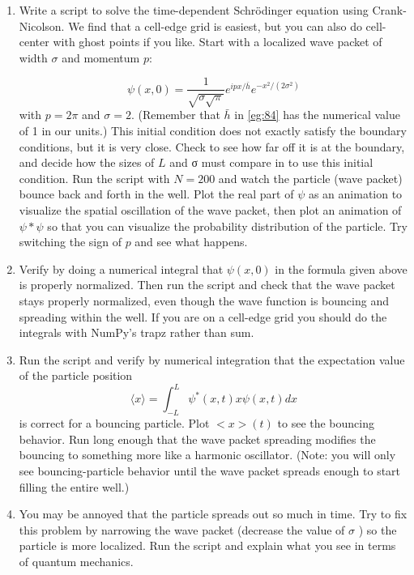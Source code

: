 \documentclass{book}
\theoremstyle{plain}
\theoremstyle{definition}
\numberwithin{exm}{chapter}
\theoremstyle{remark}
\theoremstyle{summary}
\theoremstyle{overview}
\begin{document}
\begin{enumerate}[label=(\alph*)]
	\item  Write a script to solve the time-dependent Schr{\"o}dinger equation using
Crank-Nicolson. We find that a cell-edge grid is easiest, but you can
also do cell-center with ghost points if you like. Start with a localized
wave packet of width $\sigma$ and momentum $p$:

\begin{equation}\label{eq:84}
\psi(x, 0)=\frac{1}{\sqrt{\sigma \sqrt{\pi}}} e^{i p x / \bar{h}} e^{-x^{2} /\left(2 \sigma^{2}\right)}
\end{equation}
with $p = 2\pi$ and $\sigma = 2$. (Remember that $ \bar{h}$ in \eqref{eg:84} has the numerical
value of 1 in our units.) This initial condition does not exactly satisfy
the boundary conditions, but it is very close. Check to see how far
off it is at the boundary, and decide how the sizes of $L$ and σ must
compare in to use this initial condition.
Run the script with $N = 200$ and watch the particle (wave packet)
bounce back and forth in the well. Plot the real part of $\psi$ as an animation to visualize the spatial oscillation of the wave packet, then
plot an animation of $\psi * \psi$  so that you can visualize the probability
distribution of the particle. Try switching the sign of $p$ and see what
happens.
\item Verify by doing a numerical integral that $\psi(x,0)$ in the formula given
above is properly normalized. Then run the script and check that
the wave packet stays properly normalized, even though the wave
function is bouncing and spreading within the well. If you are on a
cell-edge grid you should do the integrals with NumPy\rq s trapz rather
than sum.
\item Run the script and verify by numerical integration that the expectation
value of the particle position
\begin{equation}\label{eq:85}
\langle x\rangle=\int_{-L}^{L} \psi^{*}(x, t) x \psi(x, t) d x
\end{equation}
is correct for a bouncing particle. Plot $<x>(t)$ to see the bouncing
behavior. Run long enough that the wave packet spreading modifies
the bouncing to something more like a harmonic oscillator. (Note:
you will only see bouncing-particle behavior until the wave packet
spreads enough to start filling the entire well.)
\item You may be annoyed that the particle spreads out so much in time.
Try to fix this problem by narrowing the wave packet (decrease the
value of $\sigma$ ) so the particle is more localized. Run the script and explain
what you see in terms of quantum mechanics.


\end{enumerate}
\end{document}
